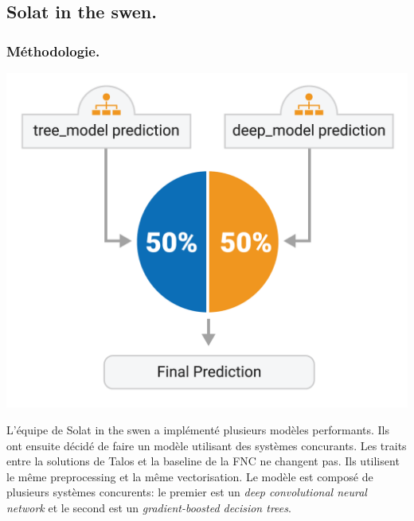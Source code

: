 \documentclass[11pt,a4paper,oldfontcommands]{memoir}
\begin{document}
\subsection{Solat in the swen.}
\subsubsection{Méthodologie.}
\begin{center}
 \includegraphics[scale=0.5]{../../img/model/solat_in_the_swen/final_prediction_light.png}
 \label{fig0}
\end{center}

L'équipe de Solat in the swen a implémenté plusieurs modèles performants.
Ils ont ensuite décidé de faire un modèle utilisant des systèmes concurants.
Les traits entre la solutions de Talos et la baseline de la FNC ne changent pas.
Ils utilisent le même preprocessing et la même vectorisation.
Le modèle est composé de plusieurs systèmes concurents: le premier est un \textit{deep convolutional neural network} et le second est un \textit{gradient-boosted decision trees}.
\end{document}

